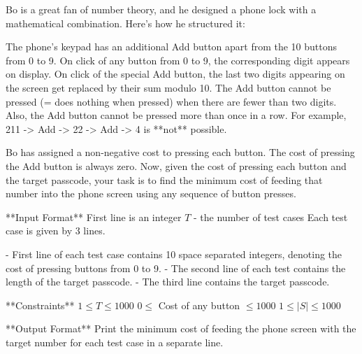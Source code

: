 Bo is a great fan of number theory, and he designed a phone lock with a mathematical combination. Here's how he structured it:

The phone's keypad has an additional Add button apart from the 10 buttons from 0 to 9. On click of any button from 0 to 9, the corresponding digit appears on display. On click of the special Add button, the last two digits appearing on the screen get replaced by their sum modulo 10. The Add button cannot be pressed (= does nothing when pressed) when there are fewer than two digits. Also, the Add button cannot be pressed more than once in a row. For example, 211 -> Add -> 22 -> Add -> 4 is **not** possible.

Bo has assigned a non-negative cost to pressing each button. The cost of pressing the Add button is always zero. Now, given the cost of pressing each button and the target passcode, your task is to find the minimum cost of feeding that number into the phone screen using any sequence of button presses.

**Input Format**  
First line is an integer $T$ - the number of test cases  
Each test case is given by 3 lines.  

- First line of each test case contains 10 space separated integers, denoting the cost of pressing buttons from 0 to 9.  
- The second line of each test contains the length of the target passcode.  
- The third line contains the target passcode.  

**Constraints**  
$1 \leq T \leq 1000$  
$0 \leq$ Cost of any button $\leq 1000$  
$1 \leq |S| \leq 1000$

**Output Format**  
Print the minimum cost of feeding the phone screen with the target number for each test case in a separate line.